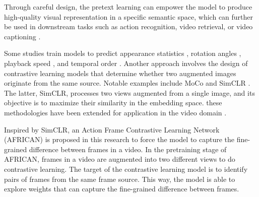 Through careful design, the pretext learning can empower the model to produce high-quality visual representation in a specific semantic space, which can further be used in downstream tasks such as action recognition, video retrieval, or video captioning \parencite{10.1145/3577925}.

Some studies train models to predict appearance statistics \parencite{Wang_2019_CVPR}, rotation angles \parencite{DBLP:journals/corr/abs-1811-11387}, playback speed \parencite{Yao_2020_CVPR, 10.1007/978-3-030-58520-4_30}, and temporal order \parencite{10.1007/978-3-030-58604-1_26}. Another approach involves the design of contrastive learning models that determine whether two augmented images originate from the same source. Notable examples include MoCo \parencite{finn2017model} and SimCLR \parencite{pmlr-v119-chen20j}. The latter, SimCLR, processes two views augmented from a single image, and its objective is to maximize their similarity in the embedding space. these methodologies have been extended for application in the video domain \parencite{Feichtenhofer_2021_CVPR}.

Inspired by SimCLR, an Action Frame Contrastive Learning Network (AFRICAN) is proposed in this research to force the model to capture the fine-grained difference between frames in a video. In the pretraining stage of AFRICAN, frames in a video are augmented into two different views to do contrastive learning. The target of the contrastive learning model is to identify pairs of frames from the same frame source. This way, the model is able to explore weights that can capture the fine-grained difference between frames. 
